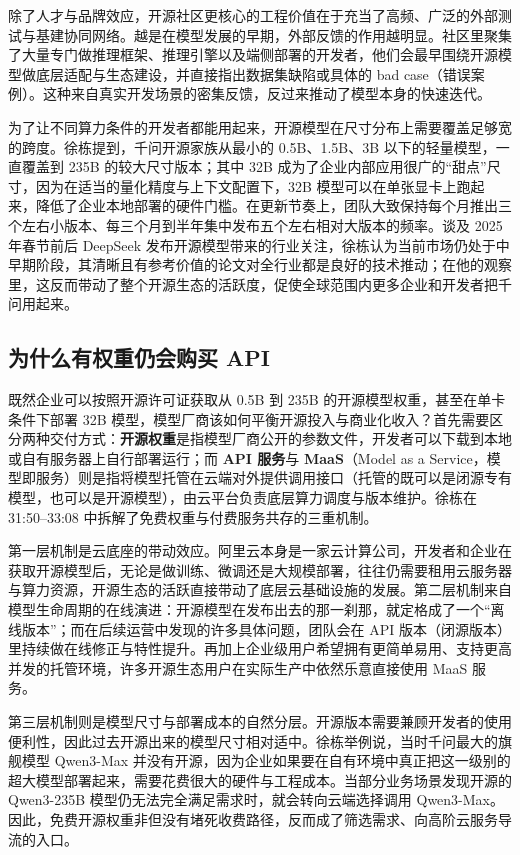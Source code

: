 \documentclass[UTF8,a4paper,11pt,fontset=fandol]{ctexart}
\begin{document}
除了人才与品牌效应，开源社区更核心的工程价值在于充当了高频、广泛的外部测试与基建协同网络。越是在模型发展的早期，外部反馈的作用越明显。社区里聚集了大量专门做推理框架、推理引擎以及端侧部署的开发者，他们会最早围绕开源模型做底层适配与生态建设，并直接指出数据集缺陷或具体的 bad case（错误案例）。这种来自真实开发场景的密集反馈，反过来推动了模型本身的快速迭代。

为了让不同算力条件的开发者都能用起来，开源模型在尺寸分布上需要覆盖足够宽的跨度。徐栋提到，千问开源家族从最小的 0.5B、1.5B、3B 以下的轻量模型，一直覆盖到 235B 的较大尺寸版本；其中 32B 成为了企业内部应用很广的“甜点”尺寸，因为在适当的量化精度与上下文配置下，32B 模型可以在单张显卡上跑起来，降低了企业本地部署的硬件门槛。在更新节奏上，团队大致保持每个月推出三个左右小版本、每三个月到半年集中发布五个左右相对大版本的频率。谈及 2025 年春节前后 DeepSeek 发布开源模型带来的行业关注，徐栋认为当前市场仍处于中早期阶段，其清晰且有参考价值的论文对全行业都是良好的技术推动；在他的观察里，这反而带动了整个开源生态的活跃度，促使全球范围内更多企业和开发者把千问用起来。

\subsection{为什么有权重仍会购买 API}
既然企业可以按照开源许可证获取从 0.5B 到 235B 的开源模型权重，甚至在单卡条件下部署 32B 模型，模型厂商该如何平衡开源投入与商业化收入？首先需要区分两种交付方式：\textbf{开源权重}是指模型厂商公开的参数文件，开发者可以下载到本地或自有服务器上自行部署运行；而 \textbf{API 服务}与 \textbf{MaaS}（Model as a Service，模型即服务）则是指将模型托管在云端对外提供调用接口（托管的既可以是闭源专有模型，也可以是开源模型），由云平台负责底层算力调度与版本维护。徐栋在 31:50–33:08 中拆解了免费权重与付费服务共存的三重机制。

第一层机制是云底座的带动效应。阿里云本身是一家云计算公司，开发者和企业在获取开源模型后，无论是做训练、微调还是大规模部署，往往仍需要租用云服务器与算力资源，开源生态的活跃直接带动了底层云基础设施的发展。第二层机制来自模型生命周期的在线演进：开源模型在发布出去的那一刹那，就定格成了一个“离线版本”；而在后续运营中发现的许多具体问题，团队会在 API 版本（闭源版本）里持续做在线修正与特性提升。再加上企业级用户希望拥有更简单易用、支持更高并发的托管环境，许多开源生态用户在实际生产中依然乐意直接使用 MaaS 服务。

第三层机制则是模型尺寸与部署成本的自然分层。开源版本需要兼顾开发者的使用便利性，因此过去开源出来的模型尺寸相对适中。徐栋举例说，当时千问最大的旗舰模型 Qwen3-Max 并没有开源，因为企业如果要在自有环境中真正把这一级别的超大模型部署起来，需要花费很大的硬件与工程成本。当部分业务场景发现开源的 Qwen3-235B 模型仍无法完全满足需求时，就会转向云端选择调用 Qwen3-Max。因此，免费开源权重非但没有堵死收费路径，反而成了筛选需求、向高阶云服务导流的入口。
\end{document}
